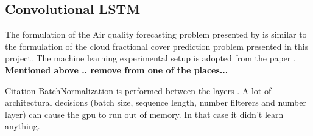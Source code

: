 \begin{table}[h]
    \centering
    \caption{Configuration of \acrshort{ar}-models. $\times$ denoted not applied, \checked denotes applied \textbf{add bias??} Gi modellen navn basert på configurasjonen $AR_{STEx}$ where x is the order. \textbf{add column of number of parameters and score to avoid extra tables?}}
    \label{tab:ar_model_config}
\end{table}

\subsection{Convolutional LSTM}
The formulation of the Air quality forecasting problem presented by  \citeauthor{SunAirLSTM} is similar to the formulation of the cloud fractional cover prediction problem presented in this project. The machine learning experimental setup is adopted from the paper . \textbf{Mentioned above .. remove from one of the places...}

Citation BatchNormalization is performed between the layers \cite{ioffe2015batch}. A lot of architectural decisions (batch size, sequence length, number filterers and number layer) can cause the \acrshort{gpu} to run out of memory. In that case it didn't learn anything. 

